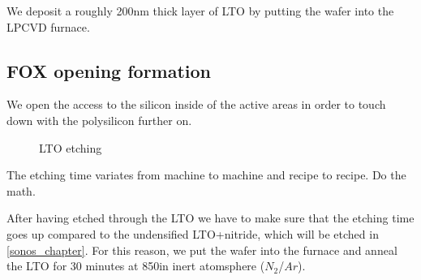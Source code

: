 We deposit a roughly 200nm thick layer of LTO by putting the wafer into the LPCVD furnace.

\subsection{FOX opening formation}\label{fox_etch}

We open the access to the silicon inside of the active areas in order to touch down with the polysilicon further on.

\begin{figure}[H]
	\centering
	\begin{tikzpicture}[node distance = 3cm, auto, thick,scale=\CrossSectionOnly, every node/.style={transform shape}]
		
	\end{tikzpicture}
	\begin{tikzpicture}[node distance = 3cm, auto, thick,scale=\CrossSectionOnly, every node/.style={transform shape}]
		
	\end{tikzpicture}
	\caption{LTO etching}
\end{figure}

The etching time variates from machine to machine and recipe to recipe. Do the math.

After having etched through the LTO we have to make sure that the etching time goes up compared to the undensified LTO+nitride,
which will be etched in \autoref{sonos_chapter}.
For this reason, we put the wafer into the furnace and anneal the LTO for 30 minutes at 850\degreesC in inert atomsphere ($N_2$/$Ar$).

